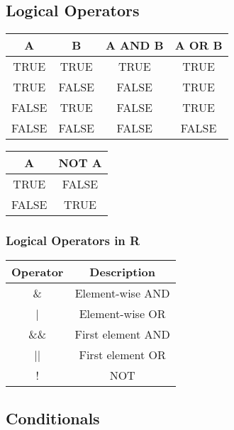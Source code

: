 \documentclass[../../dsa1101_notes.Rtex]{subfiles}\usepackage[]{graphicx}\usepackage[]{color}
\begin{document}
  \subsection{Logical Operators}
\begin{center}
\begin{tabular}{|c|c|c|c|}
\hline
A & B & A \textbf{AND} B & A \textbf{OR} B \\
\hline
TRUE & TRUE & TRUE & TRUE \\
\hline
TRUE & FALSE & FALSE & TRUE \\
\hline
FALSE & TRUE & FALSE & TRUE \\
\hline
FALSE & FALSE & FALSE & FALSE\\
\hline
\end{tabular}
\qquad
\begin{tabular}{|c|c|}
\hline
A & \textbf{NOT} A \\
\hline
TRUE & FALSE \\
\hline
FALSE & TRUE \\
\hline
\end{tabular}
\end{center}

\subsubsection{Logical Operators in R}
\begin{center}
\begin{tabular}{|c|c|}
\hline
Operator & Description \\
\hline
\& & Element-wise AND \\
\hline
| & Element-wise OR \\
\hline
\&\& & First element AND \\
\hline
|| & First element OR \\
\hline
! & NOT \\
\hline
\end{tabular}
\end{center}

\subsection{Conditionals}
\end{document}
